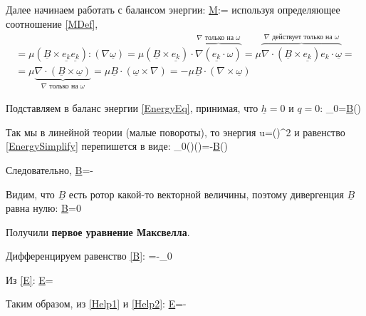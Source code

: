\documentclass[main.tex]{subfiles}
\begin{document}
Далее начинаем работать с балансом энергии:
\beq
\underline{\underline{M}}:\nabla\underline{\omega}=
\eeq
используя определяющее соотношение \eqref{MDef},
\begin{multline}
=\mu\left(\underline{B}\times\underline{e_k}\underline{e_k}\right):\left(\nabla\underline{\omega}\right)=\mu\left(\underline{B}\times\underline{e_k}\right)\cdot\overbrace{\nabla\left(\underline{e_k}\cdot\omega\right)}^{\nabla\text{ только на }\omega}=\mu\overbrace{\nabla\cdot\left(\underline{B}\times\underline{e_k}\right)e_k\cdot\underline{\omega}}^{\nabla\text{ действует только на }\omega}=\\=\mu\underbrace{\nabla\cdot\left(\underline{B}\times\underline{\omega}\right)}_{\nabla\text{ только на }\omega}=\mu\underline{B}\cdot\left(\underline{\omega}\times\nabla\right)=-\mu\underline{B}\cdot\left(\nabla\times\underline{\omega}\right)
\end{multline}

Подставляем в баланс энергии \eqref{EnergyEq}, принимая, что $\underline{h}=0$ и $q=0$:
\beq\label{EnergySimplify}
\rho_0=\mu\underline{B}\cdot\left(\nabla\times{}\right)
\eeq

Так мы в линейной теории (малые повороты), то энергия
\beq
u=\kappa\left(\nabla\times\underline{\theta}\right)^2
\eeq 
и равенство \eqref{EnergySimplify} перепишется в виде:
\beq
\rho_0\kappa\left(\nabla\times\underline{\theta}\right)\cdot{}\left(\nabla\cdot\underline{\theta}\right)=-\mu\underline{B}\cdot{}\left(\nabla\times\underline{\theta}\right)
\eeq

Следовательно,
\beq\label{B}
\underline{B}=-\frac{\rho_0\kappa}{\mu}\nabla\times\underline{\theta}
\eeq

Видим, что $\underline{B}$ есть ротор какой-то векторной величины, поэтому дивергенция $\underline{B}$ равна нулю:
\beq
\nabla\cdot\underline{B}=0
\eeq

Получили \textbf{первое уравнение Максвелла}.

Дифференцируем равенство \eqref{B}:
\beq\label{Help1}
=-\rho_0\frac{\kappa}{\mu}\nabla\times{}
\eeq

Из \eqref{E}:
\beq\label{Help2}
\nabla\times\underline{E}=\nabla\times{}
\eeq

Таким образом, из \eqref{Help1} и \eqref{Help2}:
\beq
\nabla\times\underline{E}=-
\eeq
\end{document}
